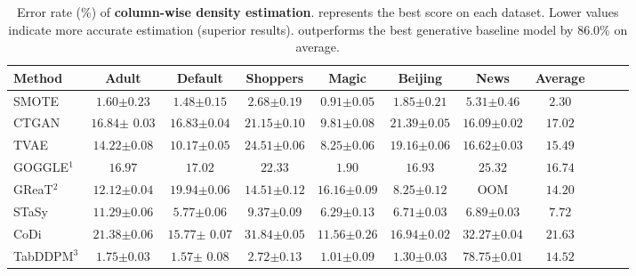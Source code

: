 \begin{table}[t!] 
    \centering
    \caption{Error rate (\%) of \textbf{column-wise density estimation}. {} represents the best score on each dataset. Lower values indicate more accurate estimation (superior results). \modelname outperforms the best generative baseline model by $86.0\%$ on average.} 
    \label{tbl:exp-shape}
    \small
    \begin{threeparttable}
    {
    \scalebox{0.92}
    {
	\begin{tabular}{lcccccc|cccc}
            \toprule[0.8pt]
            \textbf{Method} & \textbf{Adult} & \textbf{Default} & \textbf{Shoppers} & \textbf{Magic}  & \textbf{Beijing} &  \textbf{News} & \textbf{Average}  \\
            \midrule 
             SMOTE & $1.60${\tiny$\pm 0.23$} & $1.48${\tiny$\pm0.15$} & $2.68${\tiny$\pm0.19$} & $0.91${\tiny$\pm0.05$}  &$1.85${\tiny$\pm0.21$} &   $5.31${\tiny$\pm 0.46$} &  $2.30$ & \\
            \midrule
            CTGAN    & $16.84${\tiny$\pm$ $0.03$} & $16.83${\tiny$\pm$$0.04$} & $21.15${\tiny$\pm0.10$} & $9.81${\tiny$\pm0.08$}  &$21.39${\tiny$\pm0.05$} &   $16.09${\tiny$\pm 0
            .02$} & $17.02$  \\
            TVAE     & $14.22${\tiny$\pm0.08$} & $10.17${\tiny$\pm$$0.05$} & $24.51${\tiny$\pm0.06$} & $8.25${\tiny$\pm0.06$}  &  $19.16${\tiny$\pm0.06$}  &  $16.62${\tiny$\pm0.03$} &  $15.49$   \\
            GOGGLE$^{1}$   & $16.97$ & $17.02$ & $22.33$ & $1.90$  & $16.93 $ &   $25.32$  &  $16.74$ \\
            GReaT$^{2}$     & $12.12${\tiny$\pm$$0.04$} & $19.94${\tiny$\pm$$0.06$}  & $14.51${\tiny$\pm0.12$}  &  $16.16${\tiny$\pm0.09$}   & $8.25${\tiny$\pm0.12$}  &  OOM &  $14.20$ \\
            STaSy    & $11.29${\tiny$\pm0.06$} & $5.77${\tiny$\pm0.06$} & $9.37${\tiny$\pm0.09$} & $6.29${\tiny$\pm0.13$}   & $6.71${\tiny$\pm0.03$}  &  $6.89${\tiny$\pm0.03$} &  $7.72$ \\
            CoDi  & $21.38${\tiny$\pm0.06$}  & $15.77${\tiny$\pm$ $0.07$}  & $31.84${\tiny$\pm0.05$}  & $11.56${\tiny$\pm0.26$}  & $16.94${\tiny$\pm0.02$} &    $32.27${\tiny$\pm0.04$} &  $21.63$  \\
            TabDDPM$^{3}$ & $1.75${\tiny$\pm0.03$}  & $1.57${\tiny$\pm$ $0.08$}  & $2.72${\tiny$\pm0.13$}  & $1.01${\tiny$\pm0.09$}   & $1.30${\tiny$\pm0.03$}  &  $78.75${\tiny$\pm0.01$} &  $14.52$ \\

\end{tabular}}}
\end{threeparttable}
\end{table}
